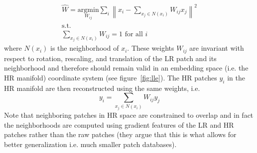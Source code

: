 \begin{gather}
    \hat{W} = \underset{W_{ij}}{\text{argmin}} \sum_i \left\| x_i - \sum_{x_j \in N(x_i)} W_{ij} x_j  \right\|^2 \nonumber \\
    \text{s.t.} \\
    \sum_{x_j \in N(x_i)} W_{ij} = 1 \text{ for all }i \nonumber
\end{gather}
where $N(x_i)$ is the neighborhood of $x_i$.
%
These weights $W_{ij}$ are invariant with respect to rotation, rescaling, and translation of the LR patch and its neighborhood\cite{saul2000introduction} and therefore should remain valid in an embedding space (i.e. the HR manifold) coordinate system (see figure~\ref{fig:lle}).
%
The HR patches $y_i$ in the HR manifold are then reconstructed using the same weights, i.e.
\begin{equation}
    y_i = \sum_{x_j \in N(x_i)} W_{ij} y_j
\end{equation}
%
Note that neighboring patches in HR space are constrained to overlap and in fact the neighborhoods are computed using gradient features of the LR and HR patches rather than the raw patches (they argue that this is what allows for better generalization i.e. much smaller patch databases).
